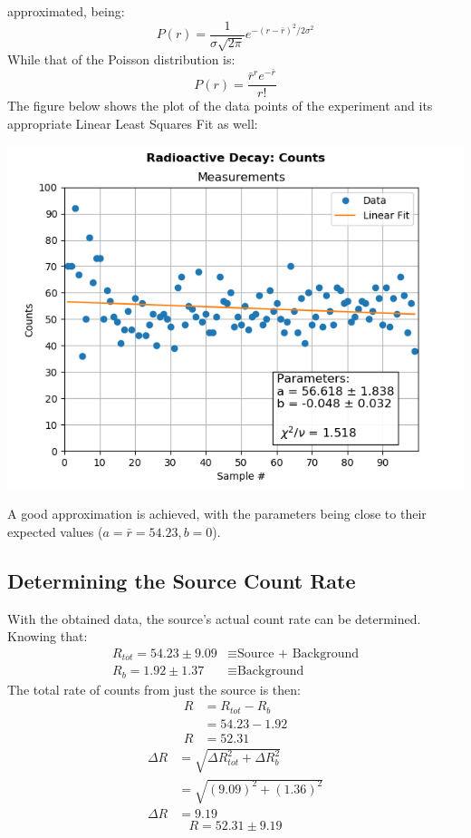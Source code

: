\documentclass[twocolumn]{article}
\begin{document}
 approximated, being:
 \begin{equation*}
  P(r) = \frac{1}{\sigma\sqrt{2\pi}} e^{-(r-\bar{r})^2 / 2\sigma^2}
 \end{equation*}
 While that of the Poisson distribution is:
 \begin{equation*}
  P(r) = \frac{\bar{r}^r e^{-\bar{r}}}{r!}
 \end{equation*}
  The figure below shows the plot of the data points of the experiment and its appropriate Linear Least Squares Fit as well:
 \centerline{\includegraphics[scale = 0.6]{fig3d}}
 A good approximation is achieved, with the parameters being close to their expected values ($a = \bar{r} = 54.23, b = 0$).
 \vfill\eject
 \subsection{Determining the Source Count Rate}
 With the obtained data, the source's actual count rate can be determined. Knowing that:
 \begin{align*}
  R_{tot} = 54.23 \pm 9.09 &\equiv \text{Source + Background} \\
  R_b = 1.92 \pm 1.37 &\equiv \text{Background}
 \end{align*}
 The total rate of counts from just the source is then:
 \begin{align*}
  R &= R_{tot} - R_b \\
  &= 54.23 - 1.92 \\
  R &= 52.31
 \end{align*}
 \begin{align*}
  \Delta R &= \sqrt{\Delta R_{tot}^2 + \Delta R_b^2} \\
  &= \sqrt{(9.09)^2 + (1.36)^2} \\
  \Delta R &= 9.19
 \end{align*}
 \begin{equation*}
  \boxed{R = 52.31 \pm 9.19}
 \end{equation*}
 
\end{document}

